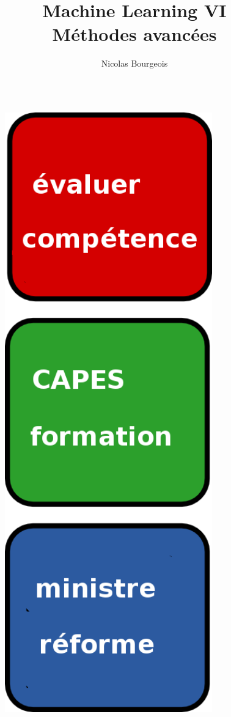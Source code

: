 \documentclass[11pt]{beamer}
\title{Machine Learning VI \\ Méthodes avancées}
\author{Nicolas Bourgeois}
\date{}
\begin{document}
\begin{frame}
\maketitle
\end{frame}


\begin{frame}
\begin{columns}

\begin{column}{0.15\linewidth}
\centering
\begin{figure}
\includegraphics[width=0.8\textwidth]{./topics.png}
\end{figure}
\end{column}


\end{columns}
\end{frame}
\end{document}
